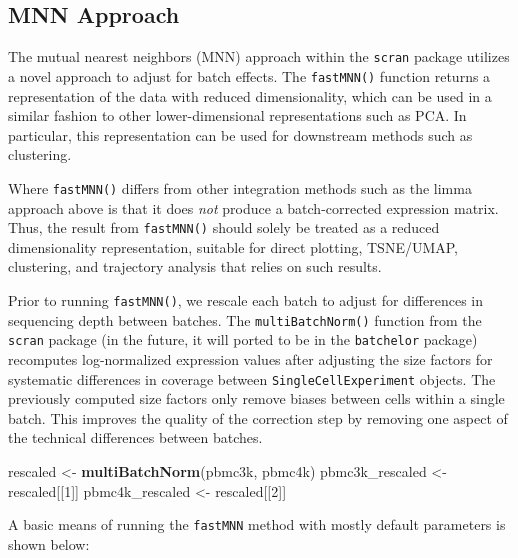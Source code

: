 \documentclass[]{book}
\newenvironment{Shaded}{\begin{snugshade}}{\end{snugshade}}
\newcommand{\CommentTok}[1]{\textcolor[rgb]{0.56,0.35,0.01}{\textit{#1}}}
\newcommand{\DataTypeTok}[1]{\textcolor[rgb]{0.13,0.29,0.53}{#1}}
\newcommand{\DecValTok}[1]{\textcolor[rgb]{0.00,0.00,0.81}{#1}}
\newcommand{\KeywordTok}[1]{\textcolor[rgb]{0.13,0.29,0.53}{\textbf{#1}}}
\newcommand{\NormalTok}[1]{#1}
\newcommand{\OperatorTok}[1]{\textcolor[rgb]{0.81,0.36,0.00}{\textbf{#1}}}
\newcommand{\OtherTok}[1]{\textcolor[rgb]{0.56,0.35,0.01}{#1}}
\newcommand{\StringTok}[1]{\textcolor[rgb]{0.31,0.60,0.02}{#1}}
\begin{document}
\hypertarget{mnn-approach}{%
\subsection{MNN Approach}\label{mnn-approach}}

The mutual nearest neighbors (MNN) approach within the \texttt{scran} package utilizes a novel approach to adjust for batch effects. The \texttt{fastMNN()} function returns a representation of the data with reduced dimensionality, which can be used in a similar fashion to other lower-dimensional representations such as PCA. In particular, this representation can be used for downstream methods such as clustering.

Where \texttt{fastMNN()} differs from other integration methods such as the limma approach above is that it does \emph{not} produce a batch-corrected expression matrix. Thus, the result from \texttt{fastMNN()} should solely be treated as a reduced dimensionality representation, suitable for direct plotting, TSNE/UMAP, clustering, and trajectory analysis that relies on such results.

Prior to running \texttt{fastMNN()}, we rescale each batch to adjust for differences in sequencing depth between batches. The \texttt{multiBatchNorm()} function from the \texttt{scran} package (in the future, it will ported to be in the \texttt{batchelor} package) recomputes log-normalized expression values after adjusting the size factors for systematic differences in coverage between \texttt{SingleCellExperiment} objects. The previously computed size factors only remove biases between cells within a single batch. This improves the quality of the correction step by removing one aspect of the technical differences between batches.

\begin{Shaded}
\begin{Highlighting}[]
\NormalTok{rescaled <-}\StringTok{ }\KeywordTok{multiBatchNorm}\NormalTok{(pbmc3k, pbmc4k) }
\NormalTok{pbmc3k_rescaled <-}\StringTok{ }\NormalTok{rescaled[[}\DecValTok{1}\NormalTok{]]}
\NormalTok{pbmc4k_rescaled <-}\StringTok{ }\NormalTok{rescaled[[}\DecValTok{2}\NormalTok{]]}
\end{Highlighting}
\end{Shaded}

A basic means of running the \texttt{fastMNN} method with mostly default parameters is shown below:

\begin{Shaded}
\end{Shaded}
\end{document}
